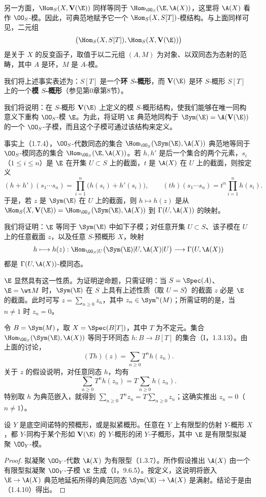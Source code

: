另一方面，$\Hom_S(X,\mathbf V(\E))$ 同样等同于
$\Hom_{\OO_S}(\E,\A(X))$，这里将 $\A(X)$ 看作 $\OO_S$-模。因此，可典范地赋予它一个 $\Hom_S(X,S[T])$-模结构。与上面同样可见，二元组
\[
\bigl(\Hom_S(X,S[T]),\Hom_S(X,\mathbf V(\E))\bigr)
\]
是关于 $X$ 的反变函子，取值于以二元组 $(A,M)$ 为对象、以双同态为态射的范畴，其中 $A$ 是环，$M$ 是 $A$-模。

我们将上述事实表述为：$S[T]$ 是一个\textbf{环 $S$-概形}，而 $\mathbf V(\E)$ 是环 $S$-概形 $S[T]$ 上的一个\textbf{模 $S$-概形}（参见第0章第8节）。

我们将说明：在 $S$-概形 $\mathbf V(\E)$ 上定义的模 $S$-概形结构，使我们能够在唯一同构意义下重构 $\OO_S$-模 $\E$。为此，将证明 $\E$ 典范地同构于 $\Sym(\E)=\A(\mathbf V(\E))$ 的一个 $\OO_S$-子模，而且这个子模可通过该结构来定义。

事实上（1.7.4），$\OO_S$-代数同态的集合
$\Hom_{\OO_S}(\Sym(\E),\A(X))$ 典范地等同于 $\OO_S$-模同态的集合
$\Hom_{\OO_S}(\E,\A(X))$。若 $h,h'$ 是后一个集合的两个元素，$s_i$（$1\leq i\leq n$）是 $\E$ 在开集 $U\subset S$ 上的截面，$t$ 是 $\A(X)$ 在 $U$ 上的截面，则按定义
\[
(h+h')(s_1\cdots s_n)=\prod_{i=1}^n\bigl(h(s_i)+h'(s_i)\bigr),
\qquad
(th)(s_1\cdots s_n)=t^n\prod_{i=1}^nh(s_i).
\]
于是，若 $z$ 是 $\Sym(\E)$ 在 $U$ 上的截面，则 $h\mapsto h(z)$ 是从
$\Hom_S(X,\mathbf V(\E))=\Hom_{\OO_S}(\Sym(\E),\A(X))$
到 $\Gamma(U,\A(X))$ 的映射。

我们将证明：$\E$ 等同于 $\Sym(\E)$ 中如下子模；对任意开集 $U\subset S$、该子模在 $U$ 上的任意截面 $z$，以及任意 $S$-预概形 $X$，映射
\[
h\longmapsto h(z):
\Hom_{\OO_S|U}\bigl(\Sym(\E)|U,\A(X)|U\bigr)
\longrightarrow\Gamma(U,\A(X))
\]
都是 $\Gamma(U,\A(X))$-模同态。

$\E$ 显然具有这一性质。为证明逆命题，只需证明：当 $S=\Spec(A)$、$\E=\wt M$ 时，$\Sym(\E)$ 在 $S$ 上具有上述性质（取 $U=S$）的截面 $z$ 必是 $\E$ 的截面。此时可写
$z=\sum_{n\geq0}z_n$，其中 $z_n\in\Sym^n(M)$；所需证明的是，当 $n\ne1$ 时 $z_n=0$。

令 $B=\Sym(M)$，取 $X=\Spec(B[T])$，其中 $T$ 为不定元。集合
$\Hom_{\OO_S}(\Sym(\E),\A(X))$ 等同于环同态 $h:B\to B[T]$ 的集合（I，1.3.13）。由上面的讨论，
\[
(Th)(z)=\sum_{n\geq0}T^nh(z_n).
\]
关于 $z$ 的假设说明，对任意同态 $h$，均有
\[
\sum_{n\geq0}T^nh(z_n)=T\sum_{n\geq0}h(z_n).
\]
特别取 $h$ 为典范嵌入，就得到
$\sum_{n\geq0}T^nz_n=T\sum_{n\geq0}z_n$；这确实推出 $z_n=0$（$n\ne1$）。

设 $Y$ 是底空间诺特的预概形，或是拟紧概形。任意在 $Y$ 上有限型的仿射 $Y$-概形 $X$，都 $Y$-同构于某个形如 $\mathbf V(\E)$ 的 $Y$-概形的闭 $Y$-子概形，其中 $\E$ 是有限型拟凝聚 $\OO_Y$-模。
\begin{proof}
拟凝聚 $\OO_Y$-代数 $\A(X)$ 为有限型（1.3.7）。所作假设推出 $\A(X)$ 由一个有限型拟凝聚 $\OO_Y$-子模 $\E$ 生成（I，9.6.5）。按定义，这说明将嵌入 $\E\to\A(X)$ 典范地延拓所得的典范同态
$\Sym(\E)\to\A(X)$ 是满射。结论于是由（1.4.10）得出。
\end{proof}

